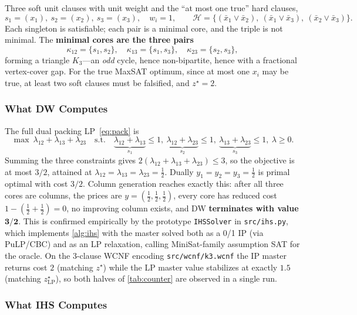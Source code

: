 Three soft unit clauses with unit weight and the ``at most one true'' hard
clauses,
\[
s_1=(x_1),\ s_2=(x_2),\ s_3=(x_3),\quad w_i=1,\qquad
\mathcal{H} = \{(\bar x_1\vee\bar x_2),\ (\bar x_1\vee\bar x_3),\ (\bar x_2\vee\bar x_3)\}.
\]
Each singleton is satisfiable; each pair is a minimal core, and the triple is
not minimal. The \textbf{minimal cores are the three pairs}
\[
\kappa_{12}=\{s_1,s_2\},\quad \kappa_{13}=\{s_1,s_3\},\quad \kappa_{23}=\{s_2,s_3\},
\]
forming a triangle $K_3$---an \emph{odd} cycle, hence non-bipartite, hence with
a fractional vertex-cover gap. For the true MaxSAT optimum, since at most one $x_i$ may be
true, at least two soft clauses must be falsified, and $z^\star = 2$.

\subsubsection{What DW Computes}
\label{sec:dwcomputes}

The full dual packing LP~\eqref{eq:pack} is
\[
\max\ \lambda_{12}+\lambda_{13}+\lambda_{23}
\quad\text{s.t.}\quad
\underbrace{\lambda_{12}+\lambda_{13}}_{s_1}\le1,\
\underbrace{\lambda_{12}+\lambda_{23}}_{s_2}\le1,\
\underbrace{\lambda_{13}+\lambda_{23}}_{s_3}\le1,\
\lambda\ge0.
\]
Summing the three constraints gives $2(\lambda_{12}+\lambda_{13}+\lambda_{23})
\le 3$, so the objective is at most $3/2$, attained at $\lambda_{12} =
\lambda_{13} = \lambda_{23} = \tfrac12$. Dually $y_1=y_2=y_3=\tfrac12$ is primal
optimal with cost $3/2$. Column generation reaches exactly this: after all three
cores are columns, the prices are $y=(\tfrac12,\tfrac12,\tfrac12)$, every core
has reduced cost $1 - (\tfrac12+\tfrac12) = 0$, no improving column exists, and
DW \textbf{terminates with value $\boldsymbol{3/2}$}. This is confirmed
empirically by the prototype \texttt{IHSSolver} in \texttt{src/ihs.py}, which
implements \cref{alg:ihs} with the master solved both as a 0/1 IP
(via PuLP/CBC) and as an LP relaxation, calling MiniSat-family assumption
SAT for the oracle. On the 3-clause WCNF encoding \texttt{src/wcnf/k3.wcnf}
the IP master returns cost $2$ (matching $z^\star$) while the LP master
value stabilizes at exactly $1.5$ (matching $z^\star_{\mathrm{LP}}$), so
both halves of \cref{tab:counter} are observed in a single run.

\subsubsection{What IHS Computes}
\label{sec:ihscomputes}

